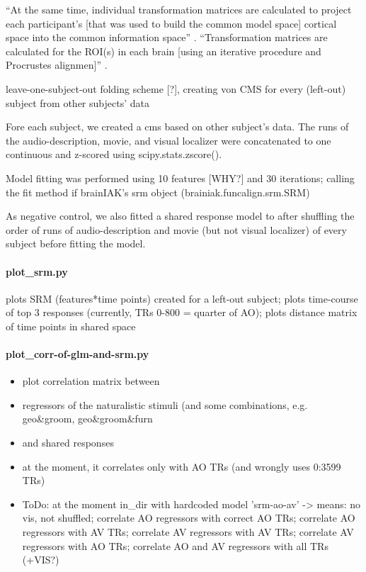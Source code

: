 ``At the same time, individual transformation matrices are calculated to project
each participant's [that was used to build the common model space] cortical
space into the common information space'' \citep{jiahui2020predicting}.
%
``Transformation matrices are calculated for the ROI(s) in each brain [using an
iterative procedure and Procrustes alignmen]'' \citep{jiahui2020predicting}.





leave-one-subject-out folding scheme [?], creating von CMS for every (left-out)
subject from other subjects' data

Fore each subject, we created a \ac{cms} based on other subject's data.
%
The runs of the audio-description, movie, and visual localizer were concatenated
to one continuous and z-scored using scipy.stats.zscore().

Model fitting was performed using 10 features [WHY?] and 30 iterations; calling
the fit method if brainIAK's srm object (brainiak.funcalign.srm.SRM)

As negative control, we also fitted a shared response model to after shuffling
the order of runs of audio-description and movie (but not visual localizer) of
every subject before fitting the model.

\paragraph{plot\_srm.py}

%
plots SRM (features*time points) created for a left-out subject; plots
time-course of top 3 responses (currently, TRs 0-800 = quarter of AO); plots
distance matrix of time points in shared space


\paragraph{plot\_corr-of-glm-and-srm.py}
%
\begin{itemize}
    \item plot correlation matrix between
    \item regressors of the naturalistic stimuli (and some combinations, e.g.
        geo\&groom, geo\&groom\&furn
    \item and shared responses
    \item at the moment, it correlates only with AO TRs (and wrongly uses
        0:3599 TRs)
    \item ToDo: at the moment in\_dir with hardcoded model 'srm-ao-av'
    ->  means: no vis, not shuffled; correlate AO regressors with correct AO
        TRs; correlate AO regressors with AV TRs; correlate AV regressors with
        AV TRs; correlate AV regressors with AO TRs; correlate AO and AV
        regressors with all TRs (+VIS?)
\end{itemize}


